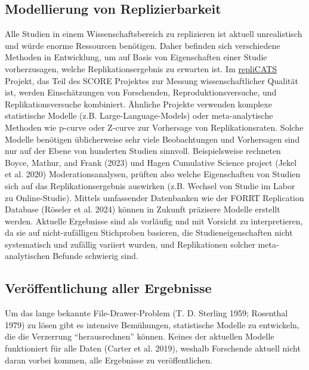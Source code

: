 \documentclass[
  letterpaper,
  DIV=11,
  numbers=noendperiod]{scrreprt}
\begin{document}
\subsection{Modellierung von
Replizierbarkeit}\label{modellierung-von-replizierbarkeit}

Alle Studien in einem Wissenschaftsbereich zu replizieren ist aktuell
unrealistisch und würde enorme Ressourcen benötigen. Daher befinden sich
verschiedene Methoden in Entwicklung, um auf Basis von Eigenschaften
einer Studie vorherzusagen, welche Replikationsergebnis zu erwarten ist.
Im \href{https://www.youtube.com/watch?v=qa2_9NrEmeA}{repliCATS}
Projekt, das Teil des SCORE Projektes zur Messung wissenschaftlicher
Qualität ist, werden Einschätzungen von Forschenden,
Reproduktionsversuche, und Replikationsversuche kombiniert. Ähnliche
Projekte verwenden komplexe statistische Modelle (z.B.
Large-Language-Models) oder meta-analytische Methoden wie p-curve oder
Z-curve zur Vorhersage von Replikationsraten. Solche Modelle benötigen
üblicherweise sehr viele Beobachtungen und Vorhersagen sind nur auf der
Ebene von hunderten Studien sinnvoll. Beispielsweise rechneten Boyce,
Mathur, and Frank (2023) und Hagen Cumulative Science project (Jekel et
al. 2020) Moderationsanalysen, prüften also welche Eigenschaften von
Studien sich auf das Replikationsergebnis auswirken (z.B. Wechsel von
Studie im Labor zu Online-Studie). Mittels umfassender Datenbanken wie
der FORRT Replication Database (Röseler et al. 2024) können in Zukunft
präzisere Modelle erstellt werden. Aktuelle Ergebnisse sind als
vorläufig und mit Vorsicht zu interpretieren, da sie auf
nicht-zufälligen Stichproben basieren, die Studieneigenschaften nicht
systematisch und zufällig variiert wurden, und Replikationen solcher
meta-analytischen Befunde schwierig sind.

\subsection{Veröffentlichung aller
Ergebnisse}\label{veruxf6ffentlichung-aller-ergebnisse}

Um das lange bekannte File-Drawer-Problem (T. D. Sterling 1959;
Rosenthal 1979) zu lösen gibt es intensive Bemühungen, statistische
Modelle zu entwickeln, die die Verzerrung ``herausrechnen'' können.
Keines der aktuellen Modelle funktioniert für alle Daten (Carter et al.
2019), weshalb Forschende aktuell nicht daran vorbei kommen, alle
Ergebnisse zu veröffentlichen.
\end{document}
